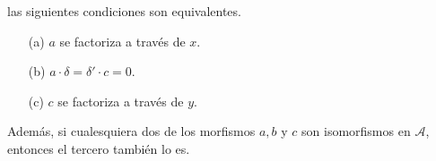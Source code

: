 \documentclass[preview]{standalone}
\begin{document}
\begin{center}
\justifying las siguientes condiciones son equivalentes. \begin{itemize} \item[(a)] $a$ se factoriza a través de $x$. \item[(b)] $a\cdot\delta = \delta'\cdot c = 0$. \item[(c)] $c$ se factoriza a través de $y$. \end{itemize}Además, si cualesquiera dos de los morfismos $a, b$ y $c$ son isomorfismos en $\mathscr{A}$, entonces el tercero también lo es.
\end{center}
\end{document}
